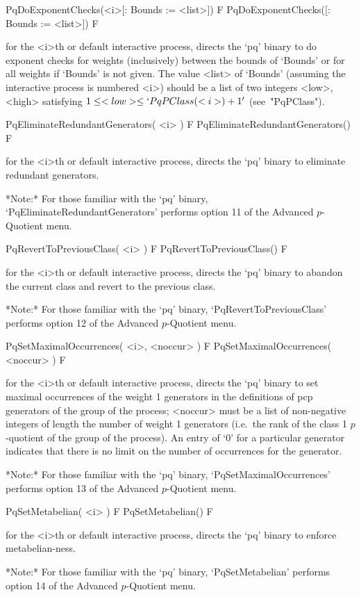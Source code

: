 \>PqDoExponentChecks(<i>[: Bounds := <list>]) F
\>PqDoExponentChecks([: Bounds := <list>]) F

for the <i>th or default interactive {\ANUPQ} process, directs  the  `pq'
binary to do exponent checks for weights (inclusively) between the bounds
of `Bounds' or for all weights if `Bounds' is not given. The value <list>
of `Bounds' (assuming the interactive process is numbered <i>) should  be
a list of  two  integers  <low>,  <high>  satisfying  $1  \le  <low>  \le
`PqPClass(<i>) + 1'$ (see~"PqPClass").

\>PqEliminateRedundantGenerators( <i> ) F
\>PqEliminateRedundantGenerators() F

for the <i>th or default interactive {\ANUPQ} process, directs  the  `pq'
binary to eliminate redundant generators.

*Note:* 
For those familiar with the `pq' binary, `PqEliminateRedundantGenerators'
performs option 11 of the Advanced $p$-Quotient menu.

\>PqRevertToPreviousClass( <i> ) F
\>PqRevertToPreviousClass() F

for the <i>th or default interactive {\ANUPQ} process, directs  the  `pq'
binary to abandon the current class and revert to the previous class.

*Note:*
For  those  familiar  with  the  `pq'  binary,  `PqRevertToPreviousClass'
performs option 12 of the Advanced $p$-Quotient menu.

\>PqSetMaximalOccurrences( <i>, <noccur> ) F
\>PqSetMaximalOccurrences( <noccur> ) F

for the <i>th or default interactive {\ANUPQ} process, directs  the  `pq'
binary to set maximal occurrences of  the  weight  1  generators  in  the
definitions of pcp generators of the group of the process; <noccur>  must
be a list of non-negative integers of  length  the  number  of  weight  1
generators (i.e.~the rank of the class 1 $p$-quotient of the group of the
process). An entry of `0' for a particular generator indicates that there
is no limit on the number of occurrences for the generator.

*Note:*
For  those  familiar  with  the  `pq'  binary,  `PqSetMaximalOccurrences'
performs option 13 of the Advanced $p$-Quotient menu.

\>PqSetMetabelian( <i> ) F
\>PqSetMetabelian() F

for the <i>th or default interactive {\ANUPQ} process, directs  the  `pq'
binary to enforce metabelian-ness.

*Note:* 
For those familiar  with  the  `pq'  binary,  `PqSetMetabelian'  performs
option 14 of the Advanced $p$-Quotient menu.

